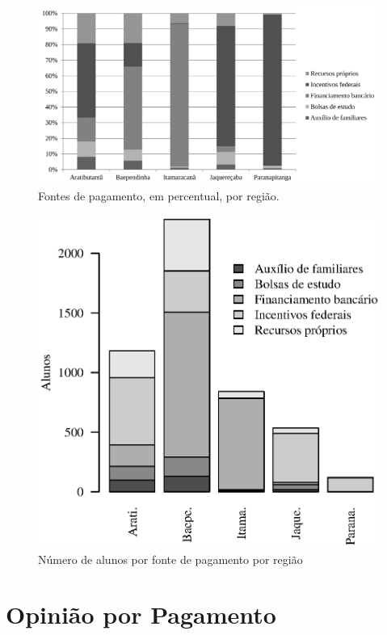 \documentclass[10pt,a4paper,oneside]{article}
\begin{document}
\begin{figure}[!h]
	\centering
	\includegraphics[width=0.80\linewidth]{plots/q11}
	\caption{Fontes de pagamento, em percentual, por região.}
	\label{figure: fonte de pagemento}
\end{figure}

\begin{figure}[!h]
	\centering
	\includegraphics[]{plots/stacked_pagamento_por_regiao.eps}
	\caption{Número de alunos por fonte de pagamento por região}
	\label{fig:fonte de pagamento absoluto}
\end{figure}

\FloatBarrier
\section{Opinião por Pagamento}
\label{section:opiniao-pagamento}
\end{document}
